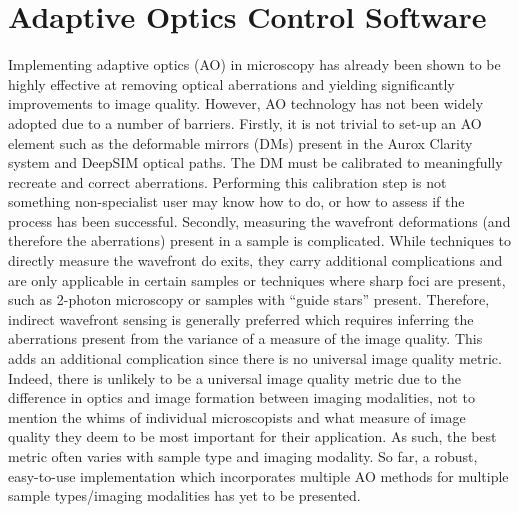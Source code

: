 \chapter{Adaptive Optics Control Software}
\label{chpt:ao_tools}

Implementing adaptive optics (AO) in microscopy has already been shown to be highly effective at removing optical aberrations and yielding significantly improvements to image quality\cite{booth2014adaptive,girkin2009adaptive}. However, AO technology has not been widely adopted due to a number of barriers. Firstly, it is not trivial to set-up an AO element such as the deformable mirrors (DMs) present in the Aurox Clarity system and DeepSIM optical paths. The DM must be calibrated to meaningfully recreate and correct aberrations. Performing this calibration step is not something non-specialist user may know how to do, or how to assess if the process has been successful. Secondly, measuring the wavefront deformations (and therefore the aberrations) present in a sample is complicated. While techniques to directly measure the  wavefront do exits, they carry additional complications and are only applicable in certain samples or techniques where sharp foci are present, such as 2-photon microscopy or samples with ``guide stars'' present\cite{ji2017adaptive,wang2014rapid,wang2015direct}. Therefore, indirect wavefront sensing is generally preferred which requires inferring the aberrations present from the variance of a measure of the image quality\cite{rodriguez2018adaptive}. This adds an additional complication since there is no universal image quality metric. Indeed, there is unlikely to be a universal image quality metric due to the difference in optics and image formation between imaging modalities, not to mention the whims of individual microscopists and what measure of image quality they deem to be most important for their application. As such, the best metric often varies with sample type and imaging modality\cite{burke2015adaptive,booth2002adaptive,fienup2003aberration,debarre2008adaptive}. So far, a robust, easy-to-use implementation which incorporates multiple AO methods for multiple sample types/imaging modalities has yet to be presented\cite{ji2017adaptive}.


